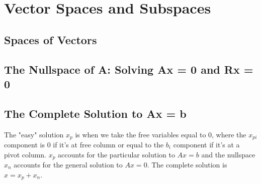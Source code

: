 \chapter{Vector Spaces and Subspaces}

\section{Spaces of Vectors}
\section{The Nullspace of A: Solving Ax = 0 and Rx = 0}

\section{The Complete Solution to Ax = b}
The "easy" solution $x_p$ is when we take the free variables equal to $0$, where the $x_{pi}$ component is $0$ if it's at free column or equal to the $b_i$ component if it's at a pivot column. $x_p$ accounts for the particular solution to $Ax = b$ and the nullspace $x_n$ accounts for the general solution to $Ax = 0$. The complete solution is $x = x_p + x_n$.  